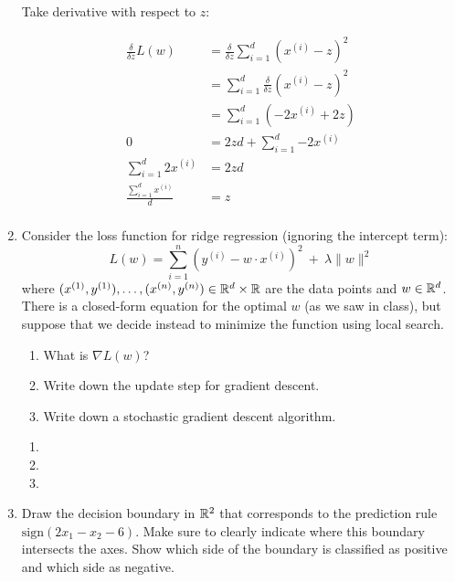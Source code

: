 \documentclass[10pt]{report}
\begin{document}
\begin{enumerate}
\begin{solution}
  Take derivative with respect to $z$:


  \begin{align*}
    \frac{\delta}{\delta z} L(w) &= \frac{\delta}{\delta z} \sum_{i=1}^d{\left(x^{(i)}-z\right)^2} \\
    &= \sum_{i=1}^d{ \frac{\delta}{\delta z} \left(x^{(i)}-z\right)^2} \\
    &= \sum_{i=1}^d{\left(-2x^{(i)}+2z\right)} \\
    0 &= 2zd + \sum_{i=1}^d{-2x^{(i)}} \\
    \sum_{i=1}^d{2x^{(i)}} &= 2zd \\
    \frac{\sum_{i=1}^d{x^{(i)}}}{d} &= z \\
  \end{align*}
\end{solution}

\item Consider the loss function for ridge regression (ignoring the intercept term):
$$ L(w) = \sum_{i=1}^n (y^{(i)} - w \cdot x^{(i)})^2 \ + \ \lambda \|w\|^2 $$
where $(x^{(1)}, y^{(1)}), \ldots, (x^{(n)}, y^{(n)}) \in {\mathbb R}^d \times {\mathbb R}$ are the data points and $w \in {\mathbb R}^d$. There is a closed-form equation for the optimal $w$ (as we saw in class), but suppose that we decide instead to minimize the function using local search.
\begin{enumerate}
\item What is $\nabla L(w)$?
\item Write down the update step for gradient descent.
\item Write down a stochastic gradient descent algorithm.
\end{enumerate}
\begin{solution}
  \begin{enumerate}
    \item
    \item
    \item
  \end{enumerate}
\end{solution}

\item Draw the decision boundary in ${\mathbb R}^2$ that corresponds to the prediction rule $\mbox{sign}(2x_1 - x_2 - 6)$. Make sure to clearly indicate where this boundary intersects the axes. Show which side of the boundary is classified as positive and which side as negative.
\begin{solution}

\end{solution}


\end{enumerate}
\end{document}
